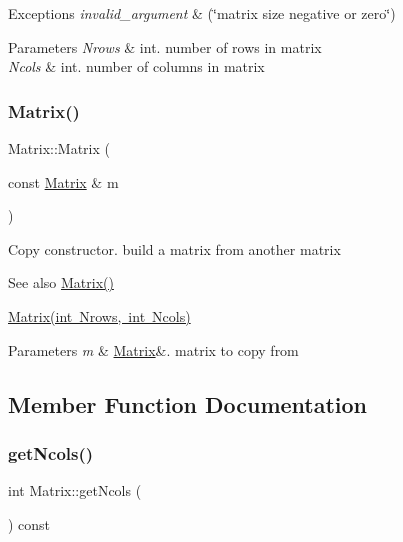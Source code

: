 \begin{DoxyExceptions}{Exceptions}
{\em invalid\+\_\+argument} & (\char`\"{}matrix size negative or zero\char`\"{}) \\
\hline
\end{DoxyExceptions}

\begin{DoxyParams}{Parameters}
{\em Nrows} & int. number of rows in matrix \\
\hline
{\em Ncols} & int. number of columns in matrix \\
\hline
\end{DoxyParams}
\mbox{\label{class_matrix_a765f4dcb51b6829311cc3e7576388423}} 
\subsubsection{\texorpdfstring{Matrix()}{Matrix()}\hspace{0.1cm}{\footnotesize\ttfamily [3/3]}}
{\footnotesize\ttfamily Matrix\+::\+Matrix (\begin{DoxyParamCaption}\item[{const \mbox{\hyperlink{class_matrix}{Matrix}} \&}]{m }\end{DoxyParamCaption})}

Copy constructor. build a matrix from another matrix \begin{DoxySeeAlso}{See also}
\mbox{\hyperlink{class_matrix_a2dba13c45127354c9f75ef576f49269b}{Matrix()}} 

\mbox{\hyperlink{class_matrix_a135a15de1126d735bb95fcc839d739d7}{Matrix(int Nrows, int Ncols)}} 
\end{DoxySeeAlso}

\begin{DoxyParams}{Parameters}
{\em m} & \mbox{\hyperlink{class_matrix}{Matrix}}\&. matrix to copy from \\
\hline
\end{DoxyParams}


\subsection{Member Function Documentation}
\mbox{\label{class_matrix_ae0a5f2154953b8d129a90b04f91d9079}} 
\subsubsection{\texorpdfstring{get\+Ncols()}{getNcols()}}
{\footnotesize\ttfamily int Matrix\+::get\+Ncols (\begin{DoxyParamCaption}{ }\end{DoxyParamCaption}) const}

